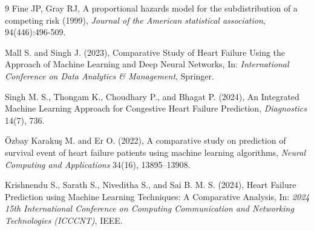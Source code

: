 \documentclass[twoside]{article}
\begin{document}
\begin{thebibliography}{9}
Fine JP, Gray RJ, A proportional hazards model for the subdistribution of a competing risk (1999), {\it Journal of the American statistical association}, 94(446):496-509. 

Mall S. and Singh J. (2023),
Comparative Study of Heart Failure Using the Approach of Machine Learning and Deep Neural Networks,
In: {\it International Conference on Data Analytics \& Management}, Springer.

Singh M. S., Thongam K., Choudhary P., and Bhagat P. (2024),
An Integrated Machine Learning Approach for Congestive Heart Failure Prediction,
{\it Diagnostics} 14(7), 736.

Özbay Karakuş M. and Er O. (2022),
A comparative study on prediction of survival event of heart failure patients using machine learning algorithms,
{\it Neural Computing and Applications} 34(16), 13895--13908.

Krishnendu S., Sarath S., Niveditha S., and Sai B. M. S. (2024),
Heart Failure Prediction using Machine Learning Techniques: A Comparative Analysis,
In: {\it 2024 15th International Conference on Computing Communication and Networking Technologies (ICCCNT)}, IEEE.

\end{thebibliography}
\end{document}

